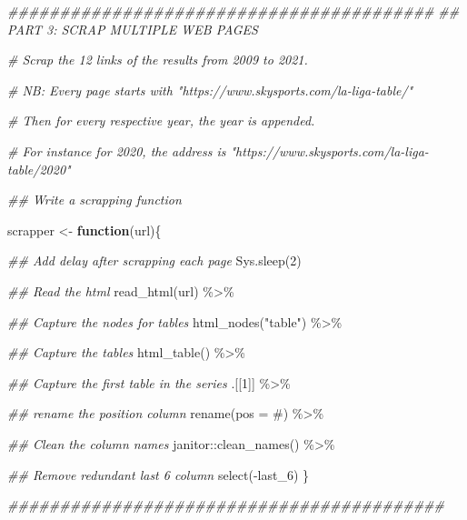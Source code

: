 \documentclass[]{tufte-handout}
\newenvironment{Shaded}{}{}
\newcommand{\AttributeTok}[1]{\textcolor[rgb]{0.49,0.56,0.16}{#1}}
\newcommand{\CommentTok}[1]{\textcolor[rgb]{0.38,0.63,0.69}{\textit{#1}}}
\newcommand{\ControlFlowTok}[1]{\textcolor[rgb]{0.00,0.44,0.13}{\textbf{#1}}}
\newcommand{\DecValTok}[1]{\textcolor[rgb]{0.25,0.63,0.44}{#1}}
\newcommand{\DocumentationTok}[1]{\textcolor[rgb]{0.73,0.13,0.13}{\textit{#1}}}
\newcommand{\FunctionTok}[1]{\textcolor[rgb]{0.02,0.16,0.49}{#1}}
\newcommand{\NormalTok}[1]{#1}
\newcommand{\OtherTok}[1]{\textcolor[rgb]{0.00,0.44,0.13}{#1}}
\newcommand{\SpecialCharTok}[1]{\textcolor[rgb]{0.25,0.44,0.63}{#1}}
\newcommand{\StringTok}[1]{\textcolor[rgb]{0.25,0.44,0.63}{#1}}
\begin{document}
\begin{Shaded}
\begin{Highlighting}[]
\DocumentationTok{\#\#\#\#\#\#\#\#\#\#\#\#\#\#\#\#\#\#\#\#\#\#\#\#\#\#\#\#\#\#\#\#\#\#\#\#\#\#\#\#\#}
\DocumentationTok{\#\# PART 3: SCRAP MULTIPLE WEB PAGES}

\CommentTok{\# Scrap the 12 links of the results from 2009 to 2021.}

\CommentTok{\# NB: Every page starts with "https://www.skysports.com/la{-}liga{-}table/"}

\CommentTok{\# Then for every respective year, the year is appended.}

\CommentTok{\# For instance for 2020, the address is "https://www.skysports.com/la{-}liga{-}table/2020"}

\DocumentationTok{\#\# Write a scrapping function}

\NormalTok{scrapper }\OtherTok{\textless{}{-}} \ControlFlowTok{function}\NormalTok{(url)\{}
        
        \DocumentationTok{\#\# Add delay after scrapping each page}
        \FunctionTok{Sys.sleep}\NormalTok{(}\DecValTok{2}\NormalTok{)}
        
        \DocumentationTok{\#\# Read the html}
        \FunctionTok{read\_html}\NormalTok{(url) }\SpecialCharTok{\%\textgreater{}\%} 
                
                \DocumentationTok{\#\# Capture the nodes for tables}
                \FunctionTok{html\_nodes}\NormalTok{(}\StringTok{"table"}\NormalTok{) }\SpecialCharTok{\%\textgreater{}\%} 
                
                \DocumentationTok{\#\# Capture the tables}
                \FunctionTok{html\_table}\NormalTok{() }\SpecialCharTok{\%\textgreater{}\%} 
                
                \DocumentationTok{\#\# Capture the first table in the series}
\NormalTok{                .[[}\DecValTok{1}\NormalTok{]] }\SpecialCharTok{\%\textgreater{}\%}
                
                \DocumentationTok{\#\# rename the position column}
                \FunctionTok{rename}\NormalTok{(}\AttributeTok{pos =} \StringTok{\textasciigrave{}}\AttributeTok{\#}\StringTok{\textasciigrave{}}\NormalTok{) }\SpecialCharTok{\%\textgreater{}\%} 
                
                \DocumentationTok{\#\# Clean the column names }
\NormalTok{                janitor}\SpecialCharTok{::}\FunctionTok{clean\_names}\NormalTok{() }\SpecialCharTok{\%\textgreater{}\%} 
        
                \DocumentationTok{\#\# Remove redundant last 6 column}
                \FunctionTok{select}\NormalTok{(}\SpecialCharTok{{-}}\NormalTok{last\_6)}
\NormalTok{\}}

\DocumentationTok{\#\#\#\#\#\#\#\#\#\#\#\#\#\#\#\#\#\#\#\#\#\#\#\#\#\#\#\#\#\#\#\#\#\#\#\#\#\#\#\#\#\#}
\end{Highlighting}
\end{Shaded}
\end{document}
